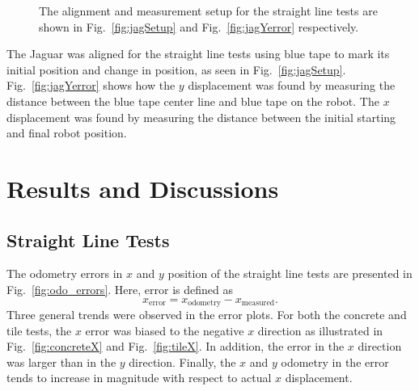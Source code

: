 \documentclass[conference]{../IEEEtran}
\begin{document}
\begin{figure}[b] \centering
  \caption{The alignment and measurement setup for the straight line tests are shown in
           Fig.~\ref{fig:jagSetup} and Fig.~\ref{fig:jagYerror} respectively.}
\end{figure}

The Jaguar was aligned for the straight line tests using blue tape to mark its initial
position and change in position, as seen in Fig.~\ref{fig:jagSetup}.
Fig.~\ref{fig:jagYerror} shows how the $y$ displacement was found by measuring the
distance between the blue tape center line and blue tape on the robot. The $x$
displacement was found by measuring the distance between the initial starting and final
robot position.

\section{Results and Discussions}

\subsection{Straight Line Tests}

The odometry errors in $x$ and $y$ position of the straight line tests are presented in
Fig.~\ref{fig:odo_errors}. Here, error is defined as
%
\begin{equation}
x_{\text{error}} = x_{\text{odometry}} - x_{\text{measured}}.
\label{eq:error}
\end{equation}
%
Three general trends were observed in the error plots. For both the concrete and tile
tests, the $x$ error was biased to the negative $x$ direction as illustrated in
Fig.~\ref{fig:concreteX} and Fig.~\ref{fig:tileX}. In addition, the error in the $x$
direction was larger than in the $y$ direction. Finally, the $x$ and $y$ odometry in the
error tends to increase in magnitude with respect to actual $x$ displacement.
\end{document}
